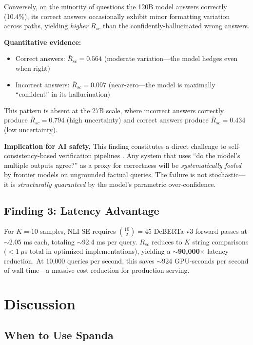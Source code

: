 \documentclass[11pt]{article}
\begin{document}
Conversely, on the minority of questions the 120B model answers correctly (10.4\%), its correct answers occasionally exhibit minor formatting variation across paths, yielding \textit{higher} $R_{sc}$ than the confidently-hallucinated wrong answers.

\textbf{Quantitative evidence:}
\begin{itemize}
    \item Correct answers: $\bar{R}_{sc} = 0.564$ (moderate variation---the model hedges even when right)
    \item Incorrect answers: $\bar{R}_{sc} = 0.097$ (near-zero---the model is maximally ``confident'' in its hallucination)
\end{itemize}

This pattern is absent at the 27B scale, where incorrect answers correctly produce $\bar{R}_{sc} = 0.794$ (high uncertainty) and correct answers produce $\bar{R}_{sc} = 0.434$ (low uncertainty).

\textbf{Implication for AI safety.} This finding constitutes a direct challenge to self-consistency-based verification pipelines \cite{wang2022self}. Any system that uses ``do the model's multiple outputs agree?'' as a proxy for correctness will be \textit{systematically fooled} by frontier models on ungrounded factual queries. The failure is not stochastic---it is \textit{structurally guaranteed} by the model's parametric over-confidence.

\subsection{Finding 3: Latency Advantage}

For $K=10$ samples, NLI SE requires $\binom{10}{2} = 45$ DeBERTa-v3 forward passes at $\sim$2.05 ms each, totaling $\sim$92.4 ms per query. $R_{sc}$ reduces to $K$ string comparisons ($< 1\ \mu$s total in optimized implementations), yielding a $\sim$\textbf{90,000$\times$} latency reduction. At 10,000 queries per second, this saves $\sim$924 GPU-seconds per second of wall time---a massive cost reduction for production serving.

\section{Discussion}

\subsection{When to Use Spanda}
\end{document}
